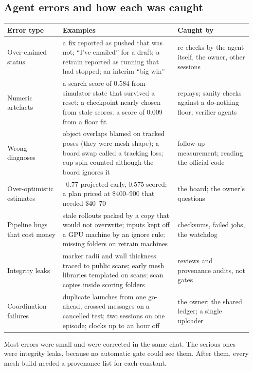 \documentclass[11pt]{article}
\begin{document}
\subsection{Agent errors and how each was caught}
\begin{table}[tbp]
\centering\small
\begin{tabularx}{\linewidth}{l>{\raggedright\arraybackslash}X>{\raggedright\arraybackslash}X}
\toprule
\textbf{Error type} & \textbf{Examples} & \textbf{Caught by} \\
\midrule
Over-claimed status & a fix reported as pushed that was not; ``I've emailed'' for a draft; a retrain reported as running that had stopped; an interim ``big win'' & re-checks by the agent itself, the owner, other sessions \\
Numeric artefacts & a search score of 0.584 from simulator state that survived a reset; a checkpoint nearly chosen from stale scores; a score of 0.009 from a floor fit & replays; sanity checks against a do-nothing floor; verifier agents \\
Wrong diagnoses & object overlaps blamed on tracked poses (they were mesh shape); a board swap called a tracking loss; cup spin counted although the board ignores it & follow-up measurement; reading the official code \\
Over-optimistic estimates & 0.74–0.77 projected early, 0.575 scored; a plan priced at \$400–900 that needed \$40–70 & the board; the owner's questions \\
Pipeline bugs that cost money & stale rollouts packed by a copy that would not overwrite; inputs kept off a GPU machine by an ignore rule; missing folders on retrain machines & checksums, failed jobs, the watchdog \\
Integrity leaks & marker radii and wall thickness traced to public scans; early mesh libraries templated on scans; scan copies inside scoring folders & reviews and provenance audits, not gates \\
Coordination failures & duplicate launches from one go-ahead; crossed messages on a cancelled test; two sessions on one episode; clocks up to an hour off & the owner; the shared ledger; a single uploader \\
\bottomrule
\end{tabularx}
\end{table}
Most errors were small and were corrected in the same chat. The serious ones were integrity leaks, because no automatic gate could see them. After them, every mesh build needed a provenance list for each constant.
\end{document}

